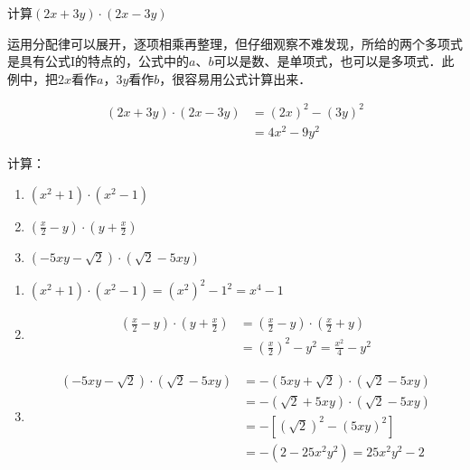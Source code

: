 \begin{example}
    计算$(2x+3y)\cdot(2x-3y)$
\end{example}

\begin{analyze}
    运用分配律可以展开，逐项相乘再整理，但仔细观察不难发现，所给的两个多项式是具有公式I的特点的，公式中的$a$、$b$可以是数、是单项式，也可以是多项式．此例中，把$2x$看作$a$，$3y$看作$b$，很容易用公式计算出来．
\end{analyze}

\begin{solution}
    \[\begin{split}
        (2x+3y)\cdot(2x-3y)&=(2x)^2-(3y)^2\\
        &=4x^2-9y^2
    \end{split}\]
\end{solution}

\begin{example}
    计算：
\begin{enumerate}
    \item $(x^2+1)\cdot (x^2-1)$
    \item $\left(\frac{x}{2}-y\right)\cdot \left(y+\frac{x}{2}\right)$
    \item $\left(-5xy-\sqrt{2}\right)\cdot \left(\sqrt{2}-5xy\right)$
\end{enumerate}
\end{example}

\begin{solution}
\begin{enumerate}
    \item $(x^2+1)\cdot (x^2-1)=(x^2)^2-1^2=x^4-1$
    \item \[\begin{split}
        \left(\frac{x}{2}-y\right)\cdot \left(y+\frac{x}{2}\right)&=\left(\frac{x}{2}-y\right)\cdot \left(\frac{x}{2}+y\right)\\
        &=\left(\frac{x}{2}\right)^2-y^2=\frac{x^2}{4}-y^2 
    \end{split}\]
    \item \[\begin{split}
    \left(-5xy-\sqrt{2}\right)\cdot \left(\sqrt{2}-5xy\right)&=-\left(5xy+\sqrt{2}\right)\cdot \left(\sqrt{2}-5xy\right)\\
    &=-(\sqrt{2}+5xy)\cdot (\sqrt{2}-5xy)\\
    &=-\left[(\sqrt{2})^2-(5xy)^2\right]\\
    &=-(2-25x^2y^2)=25x^2y^2-2
    \end{split}\]
\end{enumerate}
\end{solution}

